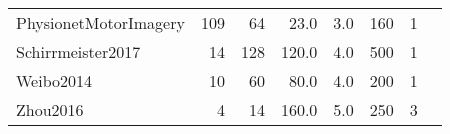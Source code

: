 \begin{tabularx}{\linewidth}{@{}Xrrrrrrr@{}}
	PhysionetMotorImagery      & 109             & 64       & 23.0            & 3.0 & 160  & 1                 & \cite{Goldberger2000}    \\
	Schirrmeister2017          & 14              & 128      & 120.0           & 4.0 & 500  & 1                 & \cite{Schirrmeister2017} \\
	Weibo2014                  & 10              & 60       & 80.0            & 4.0 & 200  & 1                 & \cite{Yi2014}            \\
	Zhou2016                   & 4               & 14       & 160.0           & 5.0 & 250  & 3                 & \cite{Zhou2016}          \\
	\bottomrule
\end{tabularx}
